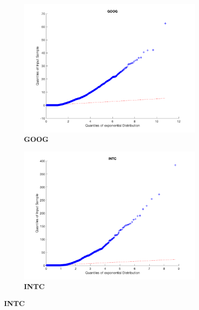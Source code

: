 \begin{figure}[htbp]
\vspace{3mm}

\begin{subfigure}[t]{0.49\textwidth}
\captionsetup{labelformat=empty}

\caption{\textbf{GOOG}}
\includegraphics[width=\textwidth, trim = 0 0 0 30, clip]{QQ_Plots/GOOG_QQ.png}

\end{subfigure}
\begin{subfigure}[t]{0.49\textwidth}
\captionsetup{labelformat=empty}

\caption{\textbf{INTC}}
\includegraphics[width=\textwidth, trim = 0 0 0 30, clip]{QQ_Plots/INTC_QQ.png}
\end{subfigure}


\end{figure}
